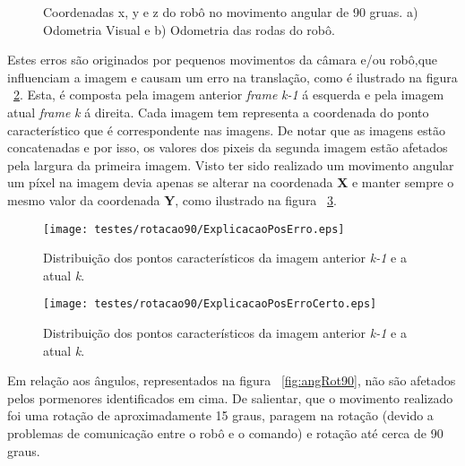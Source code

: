 \begin{figure}[h!]
	\centering
	\qquad
	\caption{Coordenadas x, y e z do robô  no movimento angular de 90 gruas. a) Odometria Visual e b) Odometria das rodas do robô.}
	\label{fig:posRot90}
\end{figure}


Estes erros são originados por pequenos movimentos da câmara e/ou robô,que influenciam a imagem e causam um erro na translação, como é ilustrado na figura ~\ref{fig:ExplicPosErr}. Esta, é composta pela imagem anterior \textit{frame} \textit{k-1} á esquerda e pela imagem atual \textit{frame} \textit{k} á direita. Cada imagem tem representa a coordenada do ponto característico que é correspondente nas imagens. De notar que as imagens estão concatenadas e por isso, os valores dos pixeis da segunda imagem estão afetados pela largura da primeira imagem. Visto ter sido realizado um movimento angular um píxel na imagem devia apenas se alterar na coordenada \textbf{X} e manter sempre o mesmo valor da coordenada \textbf{Y}, como ilustrado na figura ~\ref{fig:ExplicPosErrCerto}.



\begin{figure}[h!]
	\begin{center}
		\leavevmode		
		\texttt{[image: testes/rotacao90/ExplicacaoPosErro.eps]}
		\caption{Distribuição dos pontos característicos da imagem anterior \textit{k-1} e a atual \textit{k}.}
		\label{fig:ExplicPosErr}
	\end{center}
\end{figure}


\begin{figure}[h!]
	\begin{center}
		\leavevmode		
		\texttt{[image: testes/rotacao90/ExplicacaoPosErroCerto.eps]}
		\caption{Distribuição dos pontos característicos da imagem anterior \textit{k-1} e a atual \textit{k}.}
		\label{fig:ExplicPosErrCerto}
	\end{center}
\end{figure}


Em relação aos ângulos, representados na figura ~\ref{fig:angRot90}, não são afetados pelos pormenores identificados em cima. De salientar, que o movimento realizado foi uma rotação de aproximadamente 15 graus, paragem na rotação (devido a problemas de comunicação entre o robô e o comando) e rotação até cerca de 90 graus. 


